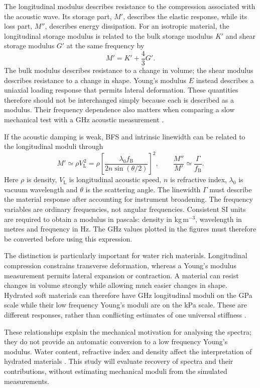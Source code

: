 \documentclass[11pt]{article}
\begin{document}
The longitudinal modulus describes resistance to the compression associated with the acoustic wave. Its storage part, $M'$, describes the elastic response, while its loss part, $M''$, describes energy dissipation. For an isotropic material, the longitudinal storage modulus is related to the bulk storage modulus $K'$ and shear storage modulus $G'$ at the same frequency by
\begin{equation}
 M'=K'+\frac{4}{3}G'.
 \label{eq:longitudinal_modulus_decomposition}
\end{equation}
The bulk modulus describes resistance to a change in volume; the shear modulus describes resistance to a change in shape. Young's modulus $E$ instead describes a uniaxial loading response that permits lateral deformation. These quantities therefore should not be interchanged simply because each is described as a modulus. Their frequency dependence also matters when comparing a slow mechanical test with a GHz acoustic measurement \citep{bouvet2025}.

If the acoustic damping is weak, BFS and intrinsic linewidth can be related to the longitudinal moduli through
\begin{equation}
 M'\simeq\rho V_{\mathrm L}^{\,2}
 =\rho\left[\frac{\lambda_0 f_{\mathrm B}}{2n\sin(\theta/2)}\right]^2,
 \qquad \frac{M''}{M'}\simeq\frac{\Gamma}{f_{\mathrm B}}.
 \label{eq:mechanical_moduli}
\end{equation}
Here $\rho$ is density, $V_{\mathrm L}$ is longitudinal acoustic speed, $n$ is refractive index, $\lambda_0$ is vacuum wavelength and $\theta$ is the scattering angle. The linewidth $\Gamma$ must describe the material response after accounting for instrument broadening. The frequency variables are ordinary frequencies, not angular frequencies. Consistent SI units are required to obtain a modulus in pascals: density in kg\,m$^{-3}$, wavelength in metres and frequency in Hz. The GHz values plotted in the figures must therefore be converted before using this expression.

The distinction is particularly important for water rich materials. Longitudinal compression constrains transverse deformation, whereas a Young's modulus measurement permits lateral expansion or contraction. A material can resist changes in volume strongly while allowing much easier changes in shape. Hydrated soft materials can therefore have GHz longitudinal moduli on the \unit{\giga\pascal} scale while their low frequency Young's moduli are on the \unit{\kilo\pascal} scale. These are different responses, rather than conflicting estimates of one universal stiffness \citep{bouvet2025}.

These relationships explain the mechanical motivation for analysing the spectra; they do not provide an automatic conversion to a low frequency Young's modulus. Water content, refractive index and density affect the interpretation of hydrated materials \citep{wu2018,bouvet2025}. This study will evaluate recovery of spectra and their contributions, without estimating mechanical moduli from the simulated measurements.
\end{document}
